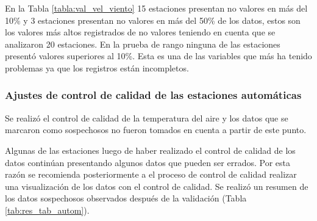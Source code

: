 En la Tabla \ref{tabla:val_vel_viento} 15 estaciones presentan no valores en más del 10\% y 3 estaciones presentan no valores en más del 50\% de los datos, estos son los valores más altos registrados de no valores teniendo en cuenta que se analizaron 20 estaciones. En la prueba de rango ninguna de las estaciones presentó valores superiores al 10\%. Esta es una de las variables que más ha tenido problemas ya que los registros están incompletos.


\subsubsection{Ajustes de control de calidad de las estaciones automáticas}

Se realizó el control de calidad de la temperatura del aire y los datos que se marcaron como sospechosos no fueron tomados en cuenta a partir de este punto. 

Algunas de las estaciones luego de haber realizado el control de calidad de los datos continúan presentando algunos datos que pueden ser errados. Por esta razón se recomienda posteriormente a el proceso de control de calidad realizar una visualización de los datos con el control de calidad. Se realizó un resumen de los datos sospechosos observados después de la validación (Tabla \ref{tab:res_tab_autom}).

